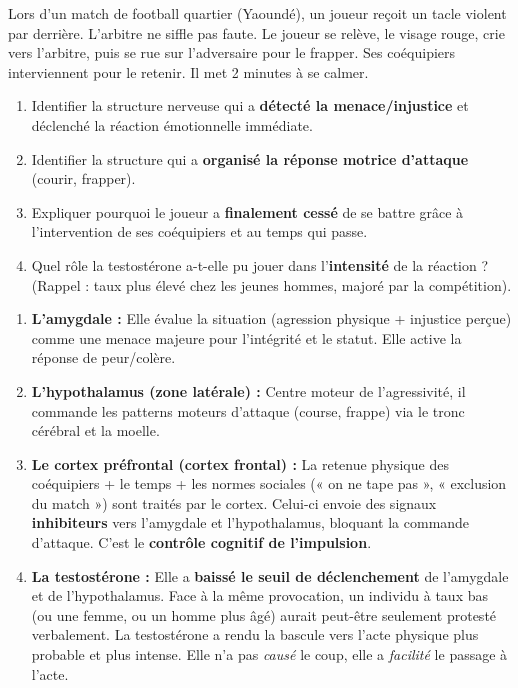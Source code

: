 \documentclass[11pt]{article}
\newcounter{popsec}
\newcounter{popsub}
\newcommand{\courssub}[1]{%
  \stepcounter{popsub}%
  \par\vspace{9pt}\noindent{\popxbold\fontsize{11.5}{13}\selectfont\color{popink}{\color{poporange}\thepopsec.\thepopsub}\hspace{6pt}#1}\par\nopagebreak\vspace{4pt}
}
\begin{document}
\courssub{Entraînement : À vous de jouer}

\begin{exercice}
Lors d'un match de football quartier (Yaoundé), un joueur reçoit un tacle violent par derrière. L'arbitre ne siffle pas faute. Le joueur se relève, le visage rouge, crie vers l'arbitre, puis se rue sur l'adversaire pour le frapper. Ses coéquipiers interviennent pour le retenir. Il met 2 minutes à se calmer.
\begin{enumerate}
    \item Identifier la structure nerveuse qui a \textbf{détecté la menace/injustice} et déclenché la réaction émotionnelle immédiate.
    \item Identifier la structure qui a \textbf{organisé la réponse motrice d'attaque} (courir, frapper).
    \item Expliquer pourquoi le joueur a \textbf{finalement cessé} de se battre grâce à l'intervention de ses coéquipiers et au temps qui passe.
    \item Quel rôle la testostérone a-t-elle pu jouer dans l'\textbf{intensité} de la réaction ? (Rappel : taux plus élevé chez les jeunes hommes, majoré par la compétition).
\end{enumerate}
\end{exercice}

\begin{corrige}
\begin{enumerate}
    \item \textbf{L'amygdale :} Elle évalue la situation (agression physique + injustice perçue) comme une menace majeure pour l'intégrité et le statut. Elle active la réponse de peur/colère.
    \item \textbf{L'hypothalamus (zone latérale) :} Centre moteur de l'agressivité, il commande les patterns moteurs d'attaque (course, frappe) via le tronc cérébral et la moelle.
    \item \textbf{Le cortex préfrontal (cortex frontal) :} La retenue physique des coéquipiers + le temps + les normes sociales (« on ne tape pas », « exclusion du match ») sont traités par le cortex. Celui-ci envoie des signaux \textbf{inhibiteurs} vers l'amygdale et l'hypothalamus, bloquant la commande d'attaque. C'est le \textbf{contrôle cognitif de l'impulsion}.
    \item \textbf{La testostérone :} Elle a \textbf{baissé le seuil de déclenchement} de l'amygdale et de l'hypothalamus. Face à la même provocation, un individu à taux bas (ou une femme, ou un homme plus âgé) aurait peut-être seulement protesté verbalement. La testostérone a rendu la bascule vers l'acte physique plus probable et plus intense. Elle n'a pas \emph{causé} le coup, elle a \emph{facilité} le passage à l'acte.
\end{enumerate}
\end{corrige}
\end{document}
